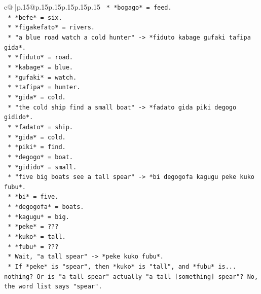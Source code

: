 \documentclass{article}
\begin{document}
{\begin{supertabular}{c@{$\;$}|p{.15\linewidth}@{}p{.15\linewidth}p{.15\linewidth}p{.15\linewidth}p{.15\linewidth}p{.15\linewidth}}
{{{\texttt{                                *   *bogago* = feed.} \\
\texttt{                                *   *befe* = six.} \\
\texttt{                                *   *figakefato* = rivers.} \\
\texttt{                            *   "a blue road watch a cold hunter" {-}> *fiduto kabage gufaki tafipa gida*.} \\
\texttt{                                *   *fiduto* = road.} \\
\texttt{                                *   *kabage* = blue.} \\
\texttt{                                *   *gufaki* = watch.} \\
\texttt{                                *   *tafipa* = hunter.} \\
\texttt{                                *   *gida* = cold.} \\
\texttt{                            *   "the cold ship find a small boat" {-}> *fadato gida piki degogo gidido*.} \\
\texttt{                                *   *fadato* = ship.} \\
\texttt{                                *   *gida* = cold.} \\
\texttt{                                *   *piki* = find.} \\
\texttt{                                *   *degogo* = boat.} \\
\texttt{                                *   *gidido* = small.} \\
\texttt{                            *   "five big boats see a tall spear" {-}> *bi degogofa kagugu peke kuko fubu*.} \\
\texttt{                                *   *bi* = five.} \\
\texttt{                                *   *degogofa* = boats.} \\
\texttt{                                *   *kagugu* = big.} \\
\texttt{                                *   *peke* = ???} \\
\texttt{                                *   *kuko* = tall.} \\
\texttt{                                *   *fubu* = ???} \\
\texttt{                                *   Wait, "a tall spear" {-}> *peke kuko fubu*.} \\
\texttt{                                *   If *peke* is "spear", then *kuko* is "tall", and *fubu* is... nothing? Or is "a tall spear" actually "a tall {[}something{]} spear"? No, the word list says "spear".} \\
}}}
\end{supertabular}}
\end{document}
